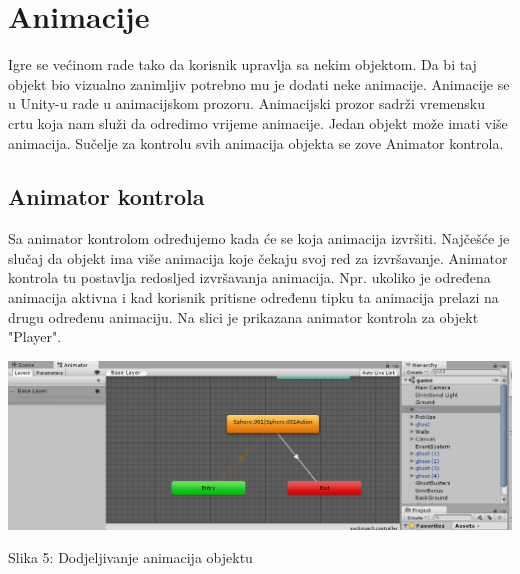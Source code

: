 \section{Animacije}
Igre se većinom rade tako da korisnik upravlja sa nekim objektom. Da bi taj objekt bio vizualno zanimljiv potrebno mu je dodati neke animacije. Animacije se u Unity-u rade u animacijskom prozoru. Animacijski prozor sadrži vremensku crtu koja nam služi da odredimo vrijeme animacije. Jedan objekt može imati više animacija.
Sučelje za kontrolu svih animacija objekta se zove Animator kontrola.

\subsection{Animator kontrola}
Sa animator kontrolom određujemo kada će se koja animacija izvršiti. Najčešće je slučaj da objekt ima više animacija koje čekaju svoj red za izvršavanje. Animator kontrola tu postavlja redosljed izvršavanja animacija. Npr. ukoliko je određena animacija aktivna i kad korisnik pritisne određenu tipku ta animacija prelazi na drugu određenu animaciju. Na slici je prikazana animator kontrola za objekt "Player". 


\begin{center}
	\includegraphics[scale=0.60]{animacijaPrimjer.png}
	
	
	Slika 5: Dodjeljivanje animacija objektu
\end{center}